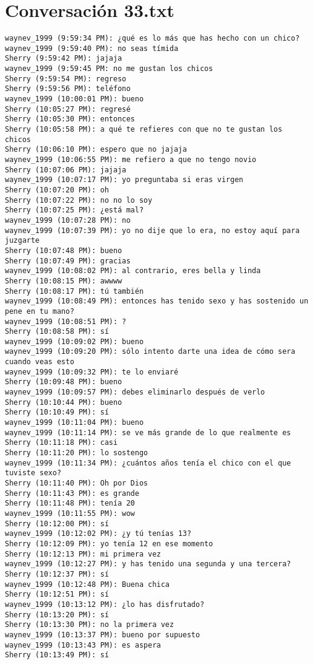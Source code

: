 \section{Conversaci\'on 33.txt}

\begin{verbatim}
waynev_1999 (9:59:34 PM): ¿qué es lo más que has hecho con un chico?
waynev_1999 (9:59:40 PM): no seas tímida
Sherry (9:59:42 PM): jajaja
waynev_1999 (9:59:45 PM: no me gustan los chicos
Sherry (9:59:54 PM): regreso
Sherry (9:59:56 PM): teléfono
waynev_1999 (10:00:01 PM): bueno
Sherry (10:05:27 PM): regresé
Sherry (10:05:30 PM): entonces
Sherry (10:05:58 PM): a qué te refieres con que no te gustan los chicos
Sherry (10:06:10 PM): espero que no jajaja
waynev_1999 (10:06:55 PM): me refiero a que no tengo novio
Sherry (10:07:06 PM): jajaja
waynev_1999 (10:07:17 PM): yo preguntaba si eras virgen
Sherry (10:07:20 PM): oh
Sherry (10:07:22 PM): no no lo soy
Sherry (10:07:25 PM): ¿está mal?
waynev_1999 (10:07:28 PM): no
waynev_1999 (10:07:39 PM): yo no dije que lo era, no estoy aquí para juzgarte
Sherry (10:07:48 PM): bueno
Sherry (10:07:49 PM): gracias
waynev_1999 (10:08:02 PM): al contrario, eres bella y linda
Sherry (10:08:15 PM): awwww
Sherry (10:08:17 PM): tú también
waynev_1999 (10:08:49 PM): entonces has tenido sexo y has sostenido un pene en tu mano?
waynev_1999 (10:08:51 PM): ?
Sherry (10:08:58 PM): sí
waynev_1999 (10:09:02 PM): bueno
waynev_1999 (10:09:20 PM): sólo intento darte una idea de cómo sera cuando veas esto
waynev_1999 (10:09:32 PM): te lo enviaré
Sherry (10:09:48 PM): bueno
waynev_1999 (10:09:57 PM): debes eliminarlo después de verlo 
Sherry (10:10:44 PM): bueno
Sherry (10:10:49 PM): sí
waynev_1999 (10:11:04 PM): bueno
waynev_1999 (10:11:14 PM): se ve más grande de lo que realmente es
Sherry (10:11:18 PM): casi
Sherry (10:11:20 PM): lo sostengo 
waynev_1999 (10:11:34 PM): ¿cuántos años tenía el chico con el que tuviste sexo?
Sherry (10:11:40 PM): Oh por Dios
Sherry (10:11:43 PM): es grande
Sherry (10:11:48 PM): tenía 20
waynev_1999 (10:11:55 PM): wow 
Sherry (10:12:00 PM): sí
waynev_1999 (10:12:02 PM): ¿y tú tenías 13?
Sherry (10:12:09 PM): yo tenía 12 en ese momento
Sherry (10:12:13 PM): mi primera vez
waynev_1999 (10:12:27 PM): y has tenido una segunda y una tercera?
Sherry (10:12:37 PM): sí 
waynev_1999 (10:12:48 PM): Buena chica
Sherry (10:12:51 PM): sí
waynev_1999 (10:13:12 PM): ¿lo has disfrutado?
Sherry (10:13:20 PM): sí
Sherry (10:13:30 PM): no la primera vez
waynev_1999 (10:13:37 PM): bueno por supuesto
waynev_1999 (10:13:43 PM): es aspera
Sherry (10:13:49 PM): sí

\end{verbatim}
